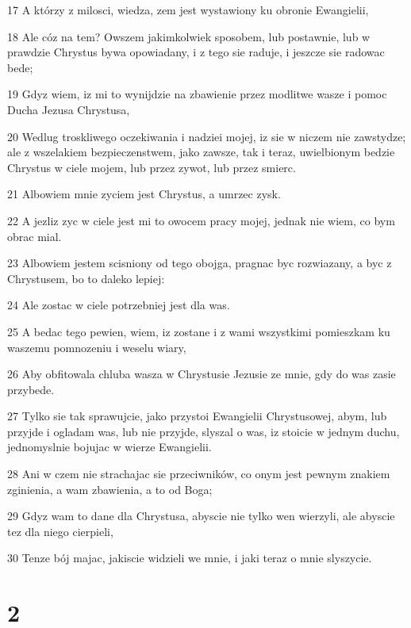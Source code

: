 \par 17 A którzy z milosci, wiedza, zem jest wystawiony ku obronie Ewangielii,
\par 18 Ale cóz na tem? Owszem jakimkolwiek sposobem, lub postawnie, lub w prawdzie Chrystus bywa opowiadany, i z tego sie raduje, i jeszcze sie radowac bede;
\par 19 Gdyz wiem, iz mi to wynijdzie na zbawienie przez modlitwe wasze i pomoc Ducha Jezusa Chrystusa,
\par 20 Wedlug troskliwego oczekiwania i nadziei mojej, iz sie w niczem nie zawstydze; ale z wszelakiem bezpieczenstwem, jako zawsze, tak i teraz, uwielbionym bedzie Chrystus w ciele mojem, lub przez zywot, lub przez smierc.
\par 21 Albowiem mnie zyciem jest Chrystus, a umrzec zysk.
\par 22 A jezliz zyc w ciele jest mi to owocem pracy mojej, jednak nie wiem, co bym obrac mial.
\par 23 Albowiem jestem scisniony od tego obojga, pragnac byc rozwiazany, a byc z Chrystusem, bo to daleko lepiej:
\par 24 Ale zostac w ciele potrzebniej jest dla was.
\par 25 A bedac tego pewien, wiem, iz zostane i z wami wszystkimi pomieszkam ku waszemu pomnozeniu i weselu wiary,
\par 26 Aby obfitowala chluba wasza w Chrystusie Jezusie ze mnie, gdy do was zasie przybede.
\par 27 Tylko sie tak sprawujcie, jako przystoi Ewangielii Chrystusowej, abym, lub przyjde i ogladam was, lub nie przyjde, slyszal o was, iz stoicie w jednym duchu, jednomyslnie bojujac w wierze Ewangielii.
\par 28 Ani w czem nie strachajac sie przeciwników, co onym jest pewnym znakiem zginienia, a wam zbawienia, a to od Boga;
\par 29 Gdyz wam to dane dla Chrystusa, abyscie nie tylko wen wierzyli, ale abyscie tez dla niego cierpieli,
\par 30 Tenze bój majac, jakiscie widzieli we mnie, i jaki teraz o mnie slyszycie.

\chapter{2}

